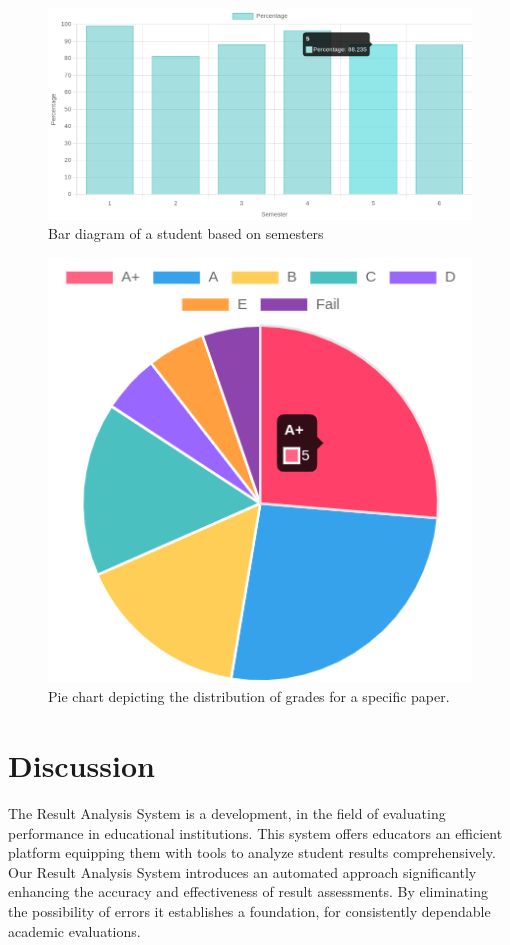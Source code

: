 \documentclass{nascproject}
\begin{document}
\begin{figure}
	\centering
	\includegraphics[width=1\linewidth]{bar_diagram.png}
	\caption{Bar diagram of a student based on semesters}
	\label{graph}
\end{figure}

\begin{figure}
	\centering
	\includegraphics[width=0.5\linewidth]{pie1.png}
	\caption{Pie chart depicting the distribution of grades for a specific paper.}
	\label{pie}
\end{figure}
\section{Discussion}
The Result Analysis System is a development, in the field of evaluating performance in educational institutions. This system offers educators an efficient platform equipping them with tools to analyze student results comprehensively. Our Result Analysis System introduces an automated approach significantly enhancing the accuracy and effectiveness of result assessments. By eliminating the possibility of errors it establishes a foundation, for consistently dependable academic evaluations.
\end{document}
